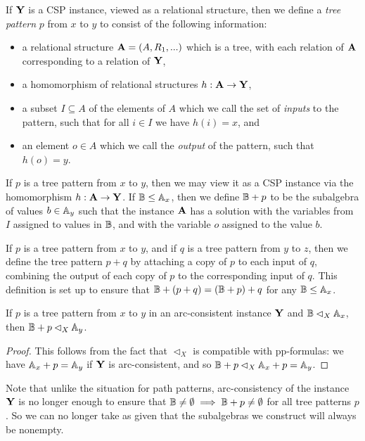 \documentclass[letterpaper,11pt]{article}
\begin{document}
\begin{defn} If $\mathbf{Y}$ is a CSP instance, viewed as a relational structure, then we define a \emph{tree pattern} $p$ from $x$ to $y$ to consist of the following information:
\begin{itemize}
\item a relational structure $\mathbf{A} = (A,R_1, ...)$ which is a tree, with each relation of $\mathbf{A}$ corresponding to a relation of $\mathbf{Y}$,
\item a homomorphism of relational structures $h : \mathbf{A} \rightarrow \mathbf{Y}$,
\item a subset $I \subseteq A$ of the elements of $A$ which we call the set of \emph{inputs} to the pattern, such that for all $i \in I$ we have $h(i) = x$, and
\item an element $o \in A$ which we call the \emph{output} of the pattern, such that $h(o) = y$.
\end{itemize}
If $p$ is a tree pattern from $x$ to $y$, then we may view it as a CSP instance via the homomorphism $h : \mathbf{A} \rightarrow \mathbf{Y}$. If $\mathbb{B} \le \mathbb{A}_x$, then we define $\mathbb{B} + p$ to be the subalgebra of values $b \in \mathbb{A}_y$ such that the instance $\mathbf{A}$ has a solution with the variables from $I$ assigned to values in $\mathbb{B}$, and with the variable $o$ assigned to the value $b$.

If $p$ is a tree pattern from $x$ to $y$, and if $q$ is a tree pattern from $y$ to $z$, then we define the tree pattern $p+q$ by attaching a copy of $p$ to each input of $q$, combining the output of each copy of $p$ to the corresponding input of $q$. This definition is set up to ensure that $\mathbb{B}+(p+q) = (\mathbb{B}+p)+q$ for any $\mathbb{B} \le \mathbb{A}_x$.
\end{defn}

\begin{prop} If $p$ is a tree pattern from $x$ to $y$ in an arc-consistent instance $\mathbf{Y}$ and $\mathbb{B} \lhd_X \mathbb{A}_x$, then $\mathbb{B} + p \lhd_X \mathbb{A}_y$.
\end{prop}
\begin{proof} This follows from the fact that $\lhd_X$ is compatible with pp-formulas: we have $\mathbb{A}_x + p = \mathbb{A}_y$ if $\mathbf{Y}$ is arc-consistent, and so $\mathbb{B}+p \lhd_X \mathbb{A}_x+p = \mathbb{A}_y$.
\end{proof}

Note that unlike the situation for path patterns, arc-consistency of the instance $\mathbf{Y}$ is no longer enough to ensure that $\mathbb{B} \ne \emptyset \implies \mathbb{B}+p \ne \emptyset$ for all tree patterns $p$. So we can no longer take as given that the subalgebras we construct will always be nonempty.
\end{document}
